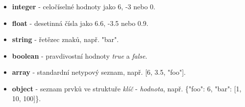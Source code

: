 \documentclass[16pt,titlepage,a4paper]{article}
\begin{document}
\begin{itemize}
    \item
    \textbf{integer} - celočíselné hodnoty jako 6, -3 nebo 0.

    \item
    \textbf{float} - desetinná čísla jako 6.6, -3.5 nebo 0.9.

    \item
    \textbf{string} - řetězec znaků, např. "bar".

    \item
    \textbf{boolean} - pravdivostní hodnoty \textit{true} a \textit{false}.

    \item
    \textbf{array} - standardní netypový seznam, např. [6, 3.5, "foo"].

    \item
    \textbf{object} - seznam prvků ve struktuře \textit{klíč} - \textit{hodnota}, např. \{"foo": 6, "bar": [1, 10, 100]\}.
\end{itemize}
\end{document}
